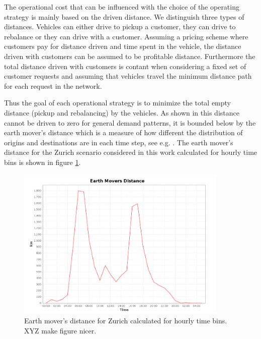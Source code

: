 The operational cost that can be influenced with the choice of the operating strategy is mainly based on the driven distance. We distinguish three types of distances. Vehicles can either drive to pickup a customer, they can drive to rebalance or they can drive with a customer. Assuming a pricing scheme where customers pay for distance driven and time spent in the vehicle, the distance driven with customers can be assumed to be profitable distance. Furthermore the total distance driven with customers is contant when considering a fixed set of customer requests and assuming that vehicles travel the minimum distance path for each request in the network.

Thus the goal of each operational strategy is to minimize the total empty distance (pickup and rebalancing) by the vehicles. As shown in \cite{treleaven2011asymptotically} this distance cannot be driven to zero for general demand patterns, it is bounded below by the earth mover's distance which is a measure of how different the distribution of origins and destinations are in each time step, see e.g. \cite{ruschendorf1985wasserstein}. The earth mover's distance for the Zurich scenario considered in this work calculated for hourly time bins is shown in figure \ref{fig:EMD}.


\begin{figure}[h]
\begin{center}\includegraphics[width=0.9\textwidth]{figures/EMDZurich.png}\end{center}
\caption{Earth mover's distance for Zurich calculated for hourly time bins. XYZ make figure nicer.}
\label{fig:EMD}
\end{figure}

